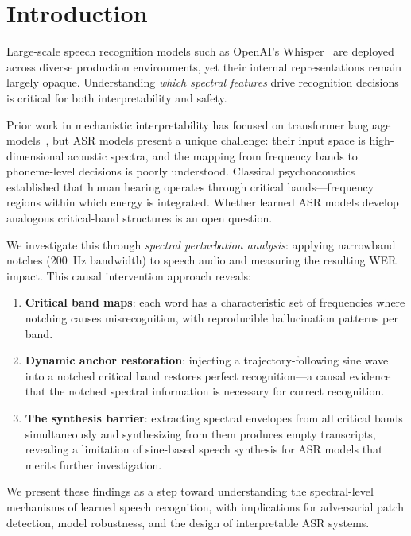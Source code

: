 \documentclass[11pt,a4paper]{article}
\begin{document}
\section{Introduction}

Large-scale speech recognition models such as OpenAI's Whisper~\cite{whisper}
are deployed across diverse production environments, yet their internal
representations remain largely opaque. Understanding \emph{which spectral
features} drive recognition decisions is critical for both interpretability and
safety.

Prior work in mechanistic interpretability has focused on transformer language
models~\cite{elm,conmy_circuit}, but ASR models present a unique challenge:
their input space is high-dimensional acoustic spectra, and the mapping from
frequency bands to phoneme-level decisions is poorly understood. Classical
psychoacoustics~\cite{zwicker_critical,fletcher_critical} established that human
hearing operates through critical bands---frequency regions within which energy
is integrated. Whether learned ASR models develop analogous critical-band
structures is an open question.

We investigate this through \emph{spectral perturbation analysis}: applying
narrowband notches (200~Hz bandwidth) to speech audio and measuring the
resulting WER impact. This causal intervention approach reveals:

\begin{enumerate}[leftmargin=*,itemsep=2pt]
    \item \textbf{Critical band maps}: each word has a characteristic set of
        frequencies where notching causes misrecognition, with reproducible
        hallucination patterns per band.
    \item \textbf{Dynamic anchor restoration}: injecting a trajectory-following
        sine wave into a notched critical band restores perfect recognition---a
        causal evidence that the notched spectral information is necessary for correct
        recognition.
    \item \textbf{The synthesis barrier}: extracting spectral envelopes from all
        critical bands simultaneously and synthesizing from them produces empty
        transcripts, revealing a limitation of sine-based speech
        synthesis for ASR models that merits further investigation.
\end{enumerate}

We present these findings as a step toward understanding the spectral-level
mechanisms of learned speech recognition, with implications for adversarial
patch detection, model robustness, and the design of interpretable ASR systems.
\end{document}

